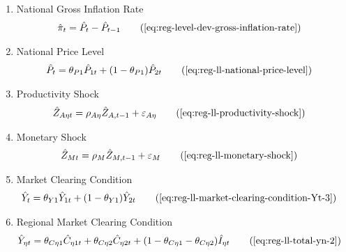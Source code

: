 \documentclass[
thesis.tex
]{subfiles}
\begin{document}
{\begin{itemize}
\begin{enumerate}
		\item National Gross Inflation Rate
		\begin{align}
			\hat{\pi}_{t} &= \hat{P}_{t} - \hat{P}_{t-1} \tag{\ref{eq:reg-level-dev-gross-inflation-rate}}
		\end{align}
		
		\item National Price Level
		\begin{alignat}{2}
			\hat{P}_{t} &= \theta_{P1} \hat{P}_{1t} + (1 -\theta_{P1}) \hat{P}_{2t} \tag{\ref{eq:reg-ll-national-price-level}}
		\end{alignat}
		
		\item Productivity Shock
		\begin{alignat}{2}
			\hat{Z}_{A\eta t} &= \rho_{A\eta} \hat{Z}_{A,t-1} + \varepsilon_{A\eta} \tag{\ref{eq:reg-ll-productivity-shock}}
		\end{alignat}
		
		\item Monetary Shock
		\begin{alignat}{2}
			\hat{Z}_{Mt} &= \rho_M \hat{Z}_{M,t-1} + \varepsilon_{M} \tag{\ref{eq:reg-ll-monetary-shock}}
		\end{alignat}
		
		\item Market Clearing Condition
		\begin{align}
			\hat{Y}_{t} &= \theta_{Y1} \hat{Y}_{1t} + (1-\theta_{Y1}) \hat{Y}_{2t} \tag{\ref{eq:reg-ll-market-clearing-condition-Yt-3}}
		\end{align}
		
		\item Regional Market Clearing Condition
		\begin{align}
			\hat{Y}_{\eta t} &= \theta_{C\eta 1} \hat{C}_{\eta 1 t} + \theta_{C\eta 2} \hat{C}_{\eta 2 t} + (1 - \theta_{C\eta 1} - \theta_{C\eta 2}) \hat{I}_{\eta t} \tag{\ref{eq:reg-ll-total-yn-2}}
		\end{align}
		
	\end{enumerate}
	
\end{itemize}

} %
\end{document}
